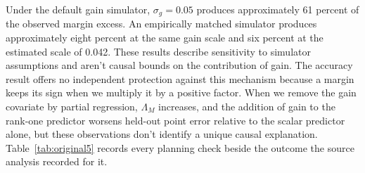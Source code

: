 Under the default gain simulator, $\sigma_g=0.05$ produces approximately 61 percent of the observed margin excess. An empirically matched simulator produces approximately eight percent at the same gain scale and six percent at the estimated scale of 0.042. These results describe sensitivity to simulator assumptions and aren't causal bounds on the contribution of gain. The accuracy result offers no independent protection against this mechanism because a margin keeps its sign when we multiply it by a positive factor. When we remove the gain covariate by partial regression, $\Lambda_M$ increases, and the addition of gain to the rank-one predictor worsens held-out point error relative to the scalar predictor alone, but these observations don't identify a unique causal explanation. Table~\ref{tab:original5} records every planning check beside the outcome the source analysis recorded for it.

